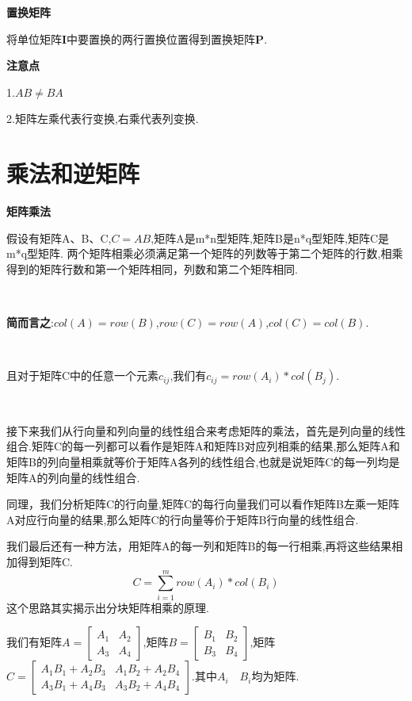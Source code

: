 \documentclass[oneside]{book}
\begin{document}
    \textbf{置换矩阵}
    
    将单位矩阵$\textbf{I} $中要置换的两行置换位置得到置换矩阵$ \textbf{P} $.
    
    
    
    \textbf{注意点}
    
    1.$ AB \neq BA $
    
    2.矩阵左乘代表行变换,右乘代表列变换.
	\chapter{乘法和逆矩阵}
	\textbf{矩阵乘法}
	
	假设有矩阵A、B、C,$ C=AB $,矩阵A是m*n型矩阵,矩阵B是n*q型矩阵,矩阵C是m*q型矩阵.
	两个矩阵相乘必须满足第一个矩阵的列数等于第二个矩阵的行数,相乘得到的矩阵行数和第一个矩阵相同，列数和第二个矩阵相同.
	
	\hspace*{\fill}\
	
	\textbf{简而言之}:$ col(A)=row(B) $,$ row(C)=row(A) $,$ col(C)=col(B) $.
	
	\hspace*{\fill}\
	
	且对于矩阵C中的任意一个元素$ c_{ij} $,我们有$ c_{ij}=row(A_{i}) * col(B_{j})$.
	
	\hspace*{\fill}\
	
	接下来我们从行向量和列向量的线性组合来考虑矩阵的乘法，首先是列向量的线性组合.矩阵C的每一列都可以看作是矩阵A和矩阵B对应列相乘的结果,那么矩阵A和矩阵B的列向量相乘就等价于矩阵A各列的线性组合,也就是说矩阵C的每一列均是矩阵A的列向量的线性组合.
	
	同理，我们分析矩阵C的行向量,矩阵C的每行向量我们可以看作矩阵B左乘一矩阵A对应行向量的结果,那么矩阵C的行向量等价于矩阵B行向量的线性组合.
	
	我们最后还有一种方法，用矩阵A的每一列和矩阵B的每一行相乘,再将这些结果相加得到矩阵C.
	$$C=\sum_{i=1}^{m}row(A_{i})*col(B_{i})$$ 
	这个思路其实揭示出分块矩阵相乘的原理.
	
	我们有矩阵$A=\left[
	\begin{array}{cc}
		A_{1} & A_{2} \\
		A_{3} & A_{4} 
	\end{array}
	\right]$,矩阵$ B=\left[
	\begin{array}{cc}
		B_{1} & B_{2} \\
		B_{3} & B_{4} 
	\end{array}
	\right] $,矩阵$ C=\left[
	\begin{array}{cc}
		A_{1}B_{1}+A_{2}B_{3} & A_{1}B_{2}+A_{2}B_{4} \\
		A_{3}B_{1}+A_{4}B_{3} & A_{3}B_{2}+A_{4}B_{4} 
	\end{array}
	\right] $.其中$ A_{i}\quad B_{i} $均为矩阵.
	
\end{document}
